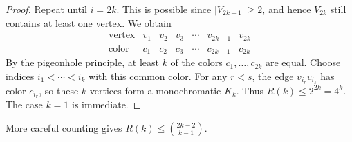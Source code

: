 \begin{proof}
    Repeat until \(i=2k\). This is possible since \(|V_{2k-1}|\ge 2\), and hence \(V_{2k}\) still contains at least one vertex. We obtain
    \[
        \begin{array}{c|cccccc}
            \text{vertex} & v_1 & v_2 & v_3 & \cdots & v_{2k-1} & v_{2k} \\
            \text{color} & c_1 & c_2 & c_3 & \cdots & c_{2k-1} & c_{2k}
        \end{array}
    \]
    By the pigeonhole principle, at least \(k\) of the colors \(c_1,\ldots,c_{2k}\) are equal. Choose indices \(i_1<\cdots<i_k\) with this common color. For any \(r<s\), the edge \(v_{i_r}v_{i_s}\) has color \(c_{i_r}\), so these \(k\) vertices form a monochromatic \(K_k\). Thus \(R(k)\le 2^{2k}=4^k\). The case \(k=1\) is immediate.
\end{proof}

\begin{remark}
    More careful counting gives \(R(k) \le \binom{2k - 2}{k - 1}\). 
\end{remark}

